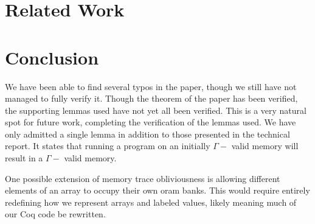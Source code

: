 \documentclass[10pt,  onecolumn]{article}
\begin{document}


%


\section{Related Work}
\label{sec:relatedwork}


\section{Conclusion}
\label{sec:conclusion}

We have been able to find several typos in the paper, though we still have not managed to fully verify it. 
Though the theorem of the paper has been verified, the supporting lemmas used have not yet all been verified. 
This is a very natural spot for future work, completing the verification of the lemmas used. 
We have only admitted a single lemma in addition to those presented in the technical report. 
It states that running a program on an initially $\Gamma-$ valid memory will result in a  $\Gamma-$ valid memory.%

One possible extension of memory trace obliviousness is allowing different elements of an array to occupy their own oram banks. 
This would require entirely redefining how we represent arrays and labeled values, likely meaning much of our Coq code be rewritten.








%
%
\cite{sf}
\cite{mtope}
\cite{techreport}
\cite{strongind}






\end{document}
